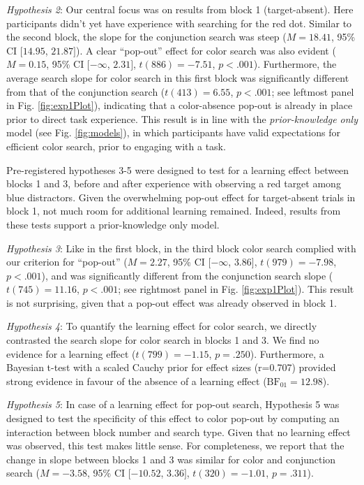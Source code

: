 \documentclass[
  english,
  man]{apa6}
\begin{document}
\emph{Hypothesis 2}: Our central focus was on results from block 1 (target-absent). Here participants didn't yet have experience with searching for the red dot. Similar to the second block, the slope for the conjunction search was steep (\(M = 18.41\), 95\% CI \([14.95\), \(21.87]\)). A clear \enquote{pop-out} effect for color search was also evident (\(M = 0.15\), 95\% CI \([-\infty\), \(2.31]\), \(t(886) = -7.51\), \(p < .001\)). Furthermore, the average search slope for color search in this first block was significantly different from that of the conjunction search (\(t(413) = 6.55\), \(p < .001\); see leftmost panel in Fig. \ref{fig:exp1Plot}), indicating that a color-absence pop-out is already in place prior to direct task experience. This result is in line with the \emph{prior-knowledge only} model (see Fig. \ref{fig:models}), in which participants have valid expectations for efficient color search, prior to engaging with a task.

Pre-registered hypotheses 3-5 were designed to test for a learning effect between blocks 1 and 3, before and after experience with observing a red target among blue distractors. Given the overwhelming pop-out effect for target-absent trials in block 1, not much room for additional learning remained. Indeed, results from these tests support a prior-knowledge only model.

\emph{Hypothesis 3}: Like in the first block, in the third block color search complied with our criterion for \enquote{pop-out} (\(M = 2.27\), 95\% CI \([-\infty\), \(3.86]\), \(t(979) = -7.98\), \(p < .001\)), and was significantly different from the conjunction search slope (\(t(745) = 11.16\), \(p < .001\); see rightmost panel in Fig. \ref{fig:exp1Plot}). This result is not surprising, given that a pop-out effect was already observed in block 1.

\emph{Hypothesis 4}: To quantify the learning effect for color search, we directly contrasted the search slope for color search in blocks 1 and 3. We find no evidence for a learning effect (\(t(799) = -1.15\), \(p = .250\)). Furthermore, a Bayesian t-test with a scaled Cauchy prior for effect sizes (r=0.707) provided strong evidence in favour of the absence of a learning effect (\(\mathrm{BF}_{\textrm{01}} = 12.98\)).

\emph{Hypothesis 5}: In case of a learning effect for pop-out search, Hypothesis 5 was designed to test the specificity of this effect to color pop-out by computing an interaction between block number and search type. Given that no learning effect was observed, this test makes little sense. For completeness, we report that the change in slope between blocks 1 and 3 was similar for color and conjunction search (\(M = -3.58\), 95\% CI \([-10.52\), \(3.36]\), \(t(320) = -1.01\), \(p = .311\)).
\end{document}
